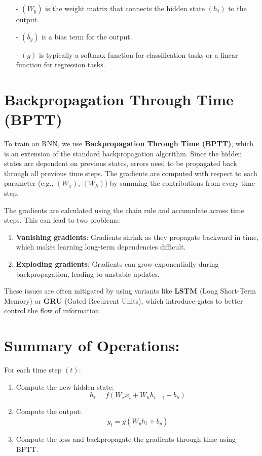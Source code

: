 \documentclass[10pt]{article}
\begin{document}
\begin{itemize}
   \item [-] $( W_y )$ is the weight matrix that connects the hidden state $( h_t )$ to the output.
   \item [-] $( b_y )$ is a bias term for the output.
   \item [-] $( g )$ is typically a softmax function for classification tasks or a linear function for regression tasks.
\end{itemize}

\section{ Backpropagation Through Time (BPTT)}
To train an RNN, we use {\bf Backpropagation Through Time (BPTT)}, which is an extension of the standard backpropagation algorithm. Since the hidden states are dependent on previous states, errors need to be propagated back through all previous time steps. The gradients are computed with respect to each parameter (e.g., $( W_x )$, $( W_h )$) by summing the contributions from every time step.

The gradients are calculated using the chain rule and accumulate across time steps. This can lead to two problems:

\begin{enumerate}
   \item {\bf Vanishing gradients}: Gradients shrink as they propagate backward in time, which makes learning long-term dependencies difficult.
   \item {\bf Exploding gradients}: Gradients can grow exponentially during backpropagation, leading to unstable updates.
\end{enumerate}

These issues are often mitigated by using variants like {\bf LSTM} (Long Short-Term Memory) or {\bf GRU} (Gated Recurrent Units), which introduce gates to better control the flow of information.

\section{ Summary of Operations:}
For each time step $( t )$:

\begin{enumerate}
   \item Compute the new hidden state:
      $$
      h_t = f(W_x x_t + W_h h_{t-1} + b_h)
      $$
   \item Compute the output:
      $$
      y_t = g(W_y h_t + b_y)
      $$
   \item Compute the loss and backpropagate the gradients through time using BPTT.
\end{enumerate}
\end{document}
